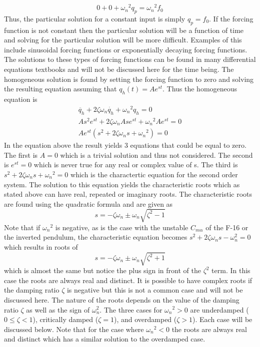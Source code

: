 \begin{equation}
    0 + 0 + {\omega_n}^2 q_p = {\omega_n}^2 f_0
\end{equation}
Thus, the particular solution for a constant input is simply $q_p = f_0$. If the forcing function is not constant then the particular solution will be a function of time and solving for the particular solution will be more difficult. Examples of this include sinusoidal forcing functions or exponentially decaying forcing functions. The solutions to these types of forcing functions can be found in many differential equations textbooks and will not be discussed here for the time being. The homogeneous solution is found by setting the forcing function to zero and solving the resulting equation assuming that $q_h(t)=Ae^{st}$. Thus the homogeneous equation is
\begin{equation}
    \begin{matrix}
    \ddot{q_h} + 2\zeta \omega_n \dot{q_h} + {\omega_n}^2 q_h = 0 \\
    A s^2 e^{st} + 2\zeta \omega_n A s e^{st} + {\omega_n}^2 A e^{st} = 0 \\
    Ae^{st}(s^2 + 2\zeta \omega_n s + {\omega_n}^2) = 0
    \end{matrix}
\end{equation}
In the equation above the result yields 3 equations that could be equal to zero. The first is $A=0$ which is a trivial solution and thus not considered. The second is $e^{st}=0$ which is never true for any real or complex value of s. The third is $s^2 + 2\zeta \omega_n s + {\omega_n}^2 = 0$ which is the charactertic equation for the second order system. The solution to this equation yields the characteristic roots which as stated above can have real, repeated or imaginary roots. The characteristic roots are found using the quadratic formula and are given as
\begin{equation}
    s = -\zeta \omega_n \pm \omega_n \sqrt{\zeta^2 - 1}
\end{equation}
Note that if ${\omega_n}^2$ is negative, as is the case with the unstable $C_{m\alpha}$ of the F-16 or the inverted pendulum, the characteristic equation becomes $s^2 + 2\zeta \omega_n s - \omega_n^2 = 0$ which results in roots of
\begin{equation}
    s = -\zeta \omega_n \pm \omega_n \sqrt{\zeta^2 + 1}
\end{equation}
which is almost the same but notice the plus sign in front of the $\zeta^2$ term. In this case the roots are always real and distinct. It is possible to have complex roots if the damping ratio $\zeta$ is negative but this is not a common case and will not be discussed here. The nature of the roots depends on the value of the damping ratio $\zeta$ as well as the sign of $\omega_n^2$. The three cases for ${\omega_n}^2>0$ are underdamped ($0 \leq \zeta<1$), critically damped ($\zeta=1$), and overdamped ($\zeta>1$). Each case will be discussed below. Note that for the case where ${\omega_n}^2<0$ the roots are always real and distinct which has a similar solution to the overdamped case.
